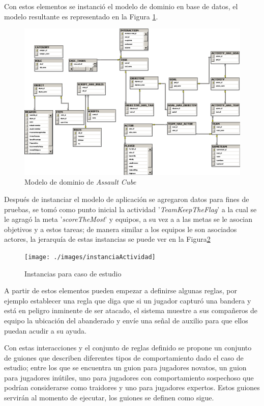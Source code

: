Con estos elementos se instanci\'o el modelo de dominio en base de datos, el modelo resultante es representado en la Figura \ref{fig:DomModel}.
\newpage
\begin{figure}[h]
\centering
\includegraphics[width=0.7\linewidth]{images/GameModelDiagram}
\caption{Modelo de dominio de \textit{Assault Cube}}
\label{fig:DomModel}
\end{figure}

Despu\'es de instanciar el modelo de aplicaci\'on se agregaron datos para fines de pruebas, se tom\'o  como punto inicial la actividad '\textit{TeamKeepTheFlag}' a la cual se le agrag\'o la meta '\textit{scoreTheMost}' y equipos, a su vez a a las metas se le asocian objetivos y a estos tareas; de manera similar a los equipos le son asociados actores, la jerarqu\'ia de estas instancias se puede ver en la Figura\ref{fig:instanciaActividad}

\begin{figure}[h]
\centering
\texttt{[image: ./images/instanciaActividad]}
\caption{Instancias para caso de estudio}
\label{fig:instanciaActividad}
\end{figure}


A partir de estos elementos pueden empezar a definirse algunas reglas, por ejemplo establecer una regla que diga que si un jugador captur\'o una bandera y est\'a en peligro inminente de ser atacado, el sistema muestre a sus compa\~neros de equipo la ubicaci\'on del abanderado y env\'ie una se\~nal de auxilio para que ellos puedan acudir a su ayuda.

Con estas interacciones y el conjunto de reglas definido se propone un conjunto de guiones que describen diferentes tipos de comportamiento dado el caso de estudio; entre los que se encuentra un guion para jugadores novatos, un guion para jugadores in\'utiles, uno para jugadores con comportamiento sospechoso que podr\'ian considerarse como traidores y uno para jugadores expertos. Estos guiones servir\'an al momento de ejecutar, los guiones se definen como sigue.

